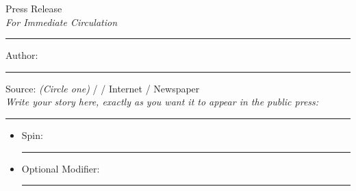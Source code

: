 \documentclass[white]{LRSguildcamp1}
\begin{document}
\name{\wPressRelease{}}

\begin{center}
\Huge{Press Release}\\
\large{\emph{For Immediate Circulation}}\\
\end{center}
\hrule
\vspace{10mm}
\Large{Author: \rule{12cm}{0.4pt}}\newline
\vspace{5mm}
\large{Source: \emph{(Circle one)} \cHeroLeague{} / \cVillainCompact{} / Internet / Newspaper}\\

\emph{Write your story here, exactly as you want it to appear in the public press:}

\vfill
\hrule
\vspace{10mm}
{\bf
\begin{itemize}
	\item Spin: \rule{12cm}{0.4pt}
	\item Optional Modifier: \rule{12cm}{0.4pt}
\end{itemize}
}
\end{document}
